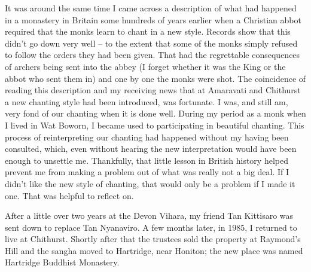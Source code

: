 It was around the same time I came across a description of what had
happened in a monastery in Britain some hundreds of years earlier when a
Christian abbot required that the monks learn to chant in a new style.
Records show that this didn't go down very well -- to the extent that
some of the monks simply refused to follow the orders they had been
given. That had the regrettable consequences of archers being sent into
the abbey (I forget whether it was the King or the abbot who sent them
in) and one by one the monks were shot. The coincidence of reading this
description and my receiving news that at Amaravati and Chithurst a new
chanting style had been introduced, was fortunate. I was, and still am,
very fond of our chanting when it is done well. During my period as a
monk when I lived in Wat Boworn, I became used to participating in
beautiful chanting. This process of reinterpreting our chanting had
happened without my having been consulted, which, even without hearing
the new interpretation would have been enough to unsettle me.
Thankfully, that little lesson in British history helped prevent me from
making a problem out of what was really not a big deal. If I didn't like
the new style of chanting, that would only be a problem if I made it
one. That was helpful to reflect on.

After a little over two years at the Devon Vihara, my friend Tan
Kittisaro was sent down to replace Tan Nyanaviro. A few months later, in
1985, I returned to live at Chithurst. Shortly after that the trustees
sold the property at Raymond's Hill and the sangha moved to Hartridge,
near Honiton; the new place was named
Hartridge Buddhist Monastery\cite{hartridge}.

